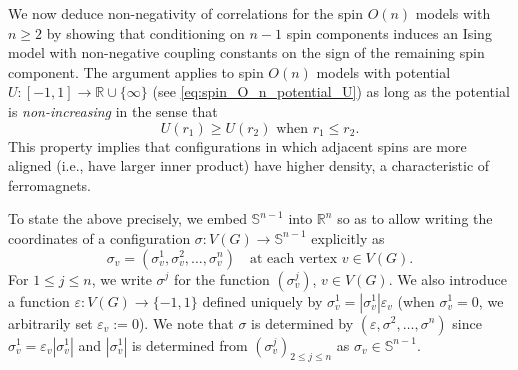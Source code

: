 \documentclass[12pt,reqno]{article}
\def\R{\mathbb{R}}
\def\eps{\varepsilon}
\begin{document}
\medbreak
We now deduce non-negativity of correlations for the spin $O(n)$
models with $n\ge 2$ by showing that conditioning on $n-1$ spin components induces an Ising model with non-negative coupling constants on the sign of the remaining spin component. The argument applies to spin $O(n)$ models
with potential $U:[-1,1]\to\mathbb{R}\cup\{\infty\}$ (see
\eqref{eq:spin_O_n_potential_U}) as long as the potential is
\emph{non-increasing} in the sense that
\begin{equation}\label{eq:ferromagnetic_def}
  \text{$U(r_1)\ge U(r_2)$ when $r_1\le r_2$.}
\end{equation}
This property implies that configurations in which adjacent spins
are more aligned (i.e., have larger inner product) have higher
density, a characteristic of ferromagnets.

To state the above precisely, we embed $\mathbb S^{n-1}$ into $\R^n$ so as to allow writing the
coordinates of a configuration $\sigma:V(G)\to \mathbb S^{n-1}$ explicitly as
\begin{equation*}
	\sigma_v = (\sigma_v^1, \sigma_v^2, \ldots, \sigma_v^n)\quad\text{at each vertex $v\in V(G)$}.
\end{equation*}
For $1\le j\le n$, we write $\sigma^j$ for the function
$(\sigma^j_v)$, $v\in V(G)$.
We also introduce a function $\eps: V(G) \to \{-1,1\}$ defined uniquely by $\sigma_v^1 = |\sigma_v^1| \eps_v$ (when $\sigma_v^1=0$, we arbitrarily set $\eps_v := 0$).
We note that $\sigma$ is determined by $(\eps, \sigma^2, \dots, \sigma^n)$ since $\sigma^1_v = \eps_v |\sigma^1_v|$ and $|\sigma_v^1|$ is determined from $(\sigma_v^j)_{2\le j\le n}$ as $\sigma_v\in \mathbb S^{n-1}$.
\end{document}
